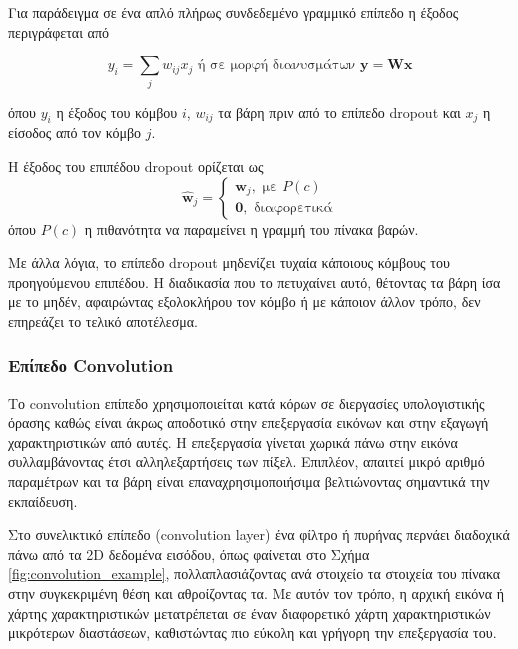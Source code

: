 	Για παράδειγμα σε ένα απλό πλήρως συνδεδεμένο γραμμικό επίπεδο η έξοδος περιγράφεται από
	
	\[ y_i = \sum_j w_{ij}x_j \text{ ή σε μορφή διανυσμάτων } \pmb{y} = \pmb{W}\pmb{x}\]
	
	όπου $y_i$ η έξοδος του κόμβου $i$, $w_{ij}$ τα βάρη πριν από το επίπεδο dropout και $x_j$ η είσοδος από τον κόμβο $j$.
	
	Η έξοδος του επιπέδου dropout ορίζεται ως
	\[ \pmb{\hat{w}}_j = 
		\begin{cases}
			\pmb{w}_j, \text{ με } P(c)\\
			\pmb{0}, \text{ διαφορετικά}
		\end{cases}	
	\]
	όπου $P(c)$ η πιθανότητα να παραμείνει η γραμμή του πίνακα βαρών. 
	
	Με άλλα λόγια, το επίπεδο dropout μηδενίζει τυχαία κάποιους κόμβους του προηγούμενου επιπέδου. Η διαδικασία που το πετυχαίνει αυτό, θέτοντας τα βάρη ίσα με το μηδέν, αφαιρώντας εξολοκλήρου τον κόμβο ή με κάποιον άλλον τρόπο, δεν επηρεάζει το τελικό αποτέλεσμα.
	
\subsubsection{Επίπεδο Convolution}
	\label{definition:convolution}

Το convolution επίπεδο χρησιμοποιείται κατά κόρων σε διεργασίες υπολογιστικής όρασης καθώς είναι άκρως αποδοτικό στην επεξεργασία εικόνων και στην εξαγωγή χαρακτηριστικών από αυτές. Η επεξεργασία γίνεται χωρικά πάνω στην εικόνα συλλαμβάνοντας έτσι αλληλεξαρτήσεις των πίξελ. Επιπλέον, απαιτεί μικρό αριθμό παραμέτρων και τα βάρη είναι επαναχρησιμοποιήσιμα βελτιώνοντας σημαντικά την εκπαίδευση.

Στο συνελικτικό επίπεδο (convolution layer) ένα φίλτρο ή πυρήνας περνάει διαδοχικά πάνω από τα 2D δεδομένα εισόδου, όπως φαίνεται στο Σχήμα \ref{fig:convolution_example}, πολλαπλασιάζοντας ανά στοιχείο τα στοιχεία του πίνακα στην συγκεκριμένη θέση και αθροίζοντας τα. Με αυτόν τον τρόπο, η αρχική εικόνα ή χάρτης χαρακτηριστικών μετατρέπεται σε έναν διαφορετικό χάρτη χαρακτηριστικών μικρότερων διαστάσεων, καθιστώντας πιο εύκολη και γρήγορη την επεξεργασία του.

